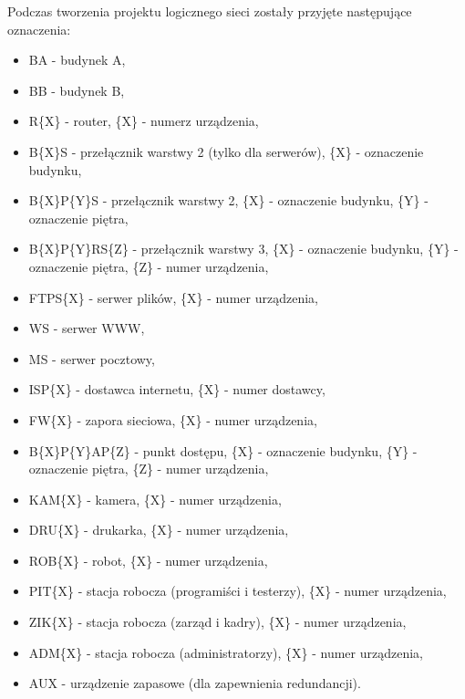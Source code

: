 \documentclass[12pt,a4paper,titlepage]{article}
\begin{document}
\newpage
Podczas tworzenia projektu logicznego sieci zostały przyjęte następujące oznaczenia:
\begin{itemize}
    \item BA - budynek A,
    \item BB - budynek B,
    \item R\{X\} - router, \{X\} - numerz urządzenia,
    \item B\{X\}S - przełącznik warstwy 2 (tylko dla serwerów), \{X\} - oznaczenie budynku,
    \item B\{X\}P\{Y\}S - przełącznik warstwy 2, \{X\} - oznaczenie budynku, \{Y\} - oznaczenie piętra,
    \item B\{X\}P\{Y\}RS\{Z\} - przełącznik warstwy 3, \{X\} - oznaczenie budynku, \{Y\} - oznaczenie piętra, \{Z\} - numer urządzenia,
    \item FTPS\{X\} - serwer plików, \{X\} - numer urządzenia,
    \item WS - serwer WWW,
    \item MS - serwer pocztowy,
    \item ISP\{X\} - dostawca internetu, \{X\} - numer dostawcy,
    \item FW\{X\} - zapora sieciowa, \{X\} - numer urządzenia,
    \item B\{X\}P\{Y\}AP\{Z\} - punkt dostępu, \{X\} - oznaczenie budynku, \{Y\} - oznaczenie piętra, \{Z\} - numer urządzenia,
    \item KAM\{X\} - kamera, \{X\} - numer urządzenia,
    \item DRU\{X\} - drukarka, \{X\} - numer urządzenia,
    \item ROB\{X\} - robot, \{X\} - numer urządzenia,
    \item PIT\{X\} - stacja robocza (programiści i testerzy), \{X\} - numer urządzenia,
    \item ZIK\{X\} - stacja robocza (zarząd i kadry), \{X\} - numer urządzenia,
    \item ADM\{X\} - stacja robocza (administratorzy), \{X\} - numer urządzenia,
    \item AUX - urządzenie zapasowe (dla zapewnienia redundancji).
\end{itemize}
\end{document}
